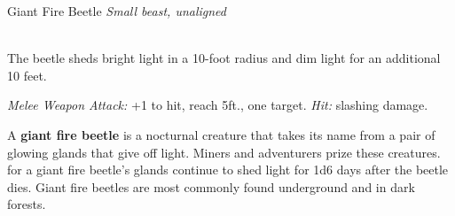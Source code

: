 \documentclass[10pt,twoside,twocolumn,openany]{book}
\begin{document}
\newpage
\begin{monsterboxnobg}{Giant Fire Beetle}
	\textit{Small beast, unaligned}\\
	\hline
	\basics[
		armorclass	= 13 (natural armor),
		hitpoints 		= \dice{1d6 + 1},
		speed		= {30 ft.}
	]
	\hline
	\stats[
		STR	= \stat{8},
		DEX	= \stat{10},
		CON	= \stat{12},
		INT	= \stat{1},
		WIS	= \stat{7},
		CHA	= \stat{3}
	]
	\hline
	\details[
		skills			= {},
		senses		= {blindsight 30 ft., passive Perception 8},
		languages		= {-},
		challenge		= 0
	]
	\hline \\[1mm]
	\begin{monsteraction}[lllumination]
		The beetle sheds bright light in a 10-foot radius and dim light for an additional 10 feet.
	\end{monsteraction}
	\begin{monsteraction}[Bite]
		\textit{Melee Weapon Attack:} +1 to hit, reach 5ft., one target. \textit{Hit:}  slashing damage.
	\end{monsteraction}
	
	A \textbf{giant fire beetle} is a nocturnal creature that takes its name from a pair of glowing glands that give off light. Miners and adventurers prize these creatures. for a giant fire beetle's glands continue to shed light for 1d6 days after the beetle dies. Giant fire beetles are most commonly found underground and in dark forests.
\end{monsterboxnobg}
\end{document}
